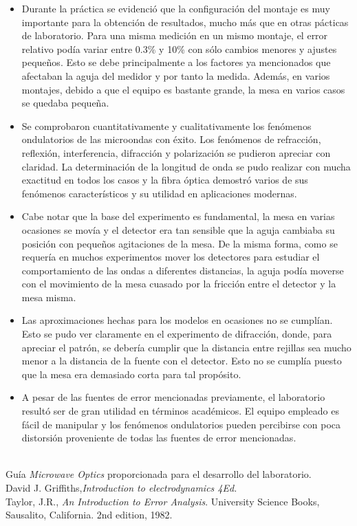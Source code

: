 \documentclass[prb,aps,twocolumn,preprintnumbers,amsmath,amssymb]{revtex4}
\begin{document}
\begin{itemize}
	\item Durante la práctica se evidenció que la configuración del montaje es muy importante para la obtención de resultados, mucho más que en otras pácticas de laboratorio. Para una misma medición en un mismo montaje, el error relativo podía variar entre 0.3\% y 10\% con sólo cambios menores y ajustes pequeños. Esto se debe principalmente a los factores ya mencionados que afectaban la aguja del medidor y por tanto la medida. Además, en varios montajes, debido a que el equipo es bastante grande, la mesa en varios casos se quedaba pequeña.
	
	\item Se comprobaron cuantitativamente y cualitativamente los fenómenos ondulatorios de las microondas con éxito. Los fenómenos de refracción, reflexión, interferencia, difracción y polarización se pudieron apreciar con claridad. La determinación de la longitud de onda se pudo realizar con mucha exactitud en todos los casos y la fibra óptica demostró varios de sus fenómenos característicos y su utilidad en aplicaciones modernas.
	
	\item Cabe notar que la base del experimento es fundamental, la mesa en varias ocasiones se movía y el detector era tan sensible que la aguja cambiaba su posición con pequeños agitaciones de la mesa. De la misma forma, como se requería en muchos experimentos mover los detectores para estudiar el comportamiento de las ondas a diferentes distancias, la aguja podía moverse con el movimiento de la mesa cuasado por la fricción entre el detector y la mesa misma.
	
	\item Las aproximaciones hechas para los modelos en ocasiones no se cumplían. Esto se pudo ver claramente en el experimento de difracción, donde, para apreciar el patrón, se debería cumplir que la distancia entre rejillas sea mucho menor a la distancia de la fuente con el detector. Esto no se cumplía puesto que la mesa era demasiado corta para tal propósito.
	
	\item A pesar de las fuentes de error mencionadas previamente, el laboratorio resultó ser de gran utilidad en términos académicos. El equipo empleado es fácil de manipular y los fenómenos ondulatorios pueden percibirse con poca distorsión proveniente de todas las fuentes de error mencionadas. 
	
\end{itemize}

\begin{thebibliography}{99}
\
\\
 Guía \textit{Microwave Optics} proporcionada para el desarrollo del laboratorio.\\
\bibitem{Griffiths} David J. Griffiths,{\it Introduction to electrodynamics 4Ed.}\\ 
\bibitem{error} Taylor, J.R., \textit{An Introduction to Error Analysis}. University Science Books, Sausalito, California. 2nd edition, 1982.\\
\end{thebibliography}
\end{document}
